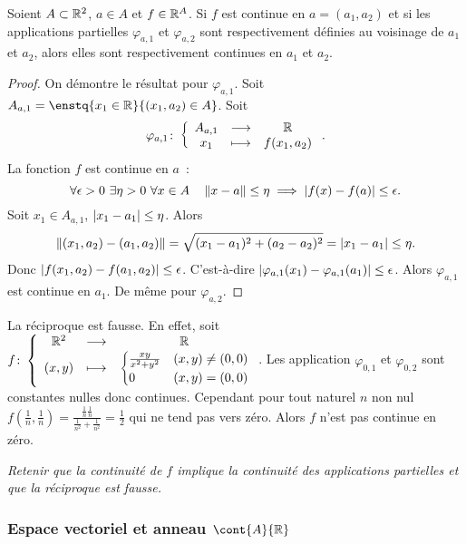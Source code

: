 \begin{prop}
  Soient $A \subset \mathbb{R}^2$, $a \in A$ et $f \in \mathbb{R}^A$. Si $f$ est continue en $a=(a_1, a_2)$ et si les applications partielles $\varphi_{a, 1}$ et $\varphi_{a, 2}$ sont respectivement définies au voisinage de $a_1$ et $a_2$, alors elles sont respectivement continues en $a_1$ et $a_2$.
\end{prop}
\begin{proof}
  On démontre le résultat pour $\varphi_{a, 1}$. Soit $A_{a, 1} = \enstq{x_1 \in \R}{(x_1, a_2) \in A}$. Soit
  \begin{equation}
    \varphi_{a, 1}\colon \left\{\begin{array}{ccc} A_{a, 1} & \longrightarrow &\mathbb{R}\\ x_1 & \longmapsto & f(x_1, a_2) \end{array} \right..
  \end{equation}
  La fonction $f$ est continue en $a$~:
  \begin{equation}
    \forall \epsilon >0 \ \exists \eta>0 \ \forall x \in A \quad \left\lVert x-a\right\rVert \leq \eta \implies \left\lvert f(x)-f(a)\right\rvert \leq \epsilon.
  \end{equation}
  Soit $x_1 \in A_{a, 1}$, $\left\lvert x_1 - a_1\right\rvert\leq \eta$. Alors
  \begin{equation}
    \left\lVert(x_1, a_2) - (a_1, a_2)\right\rVert = \sqrt{(x_1-a_1)^2 +(a_2-a_2)^2}=\left\lvert x_1-a_1\right\rvert\leq \eta.
  \end{equation}
  Donc $\left\lvert f(x_1, a_2) - f(a_1, a_2)\right\rvert \leq \epsilon$. C'est-à-dire $\left\lvert\varphi_{a, 1}(x_1)-\varphi_{a, 1}(a_1)\right\rvert \leq \epsilon$. Alors $\varphi_{a, 1}$ est continue en $a_1$. De même pour $\varphi_{a, 2}$.
\end{proof}

La réciproque est fausse. En effet, soit $f\colon \left\{\begin{array}{ccc} \mathbb{R}^2 & \longrightarrow &\mathbb{R}\\ (x, y) & \longmapsto & \begin{cases} \frac{xy}{x^2+y^2} & (x, y) \neq (0, 0) \\ 0 & (x, y)=(0, 0) \end{cases} \end{array} \right.$. Les application $\varphi_{0, 1}$ et $\varphi_{0, 2}$ sont constantes nulles donc continues. Cependant pour tout naturel $n$ non nul $f\left(\frac{1}{n}, \frac{1}{n}\right)=\frac{\frac{1}{n} \frac{1}{n}}{\frac{1}{n^2} + \frac{1}{n^2}}=\frac{1}{2}$ qui ne tend pas vers zéro. Alors $f$ n'est pas continue en zéro.

\emph{Retenir que la continuité de $f$ implique la continuité des applications partielles et que la réciproque est \emph{fausse}.}

\subsubsection{Espace vectoriel et anneau $\cont{A}{\R}$}

